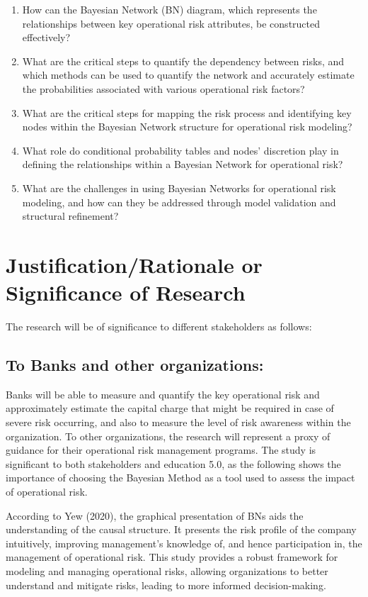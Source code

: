 \begin{enumerate}
    \item How can the Bayesian Network (BN) diagram, which represents the relationships between key operational risk attributes, be constructed effectively?
    \item What are the critical steps to quantify the dependency between risks, and which methods can be used to quantify the network and accurately estimate the probabilities associated with various operational risk factors?
    \item What are the critical steps for mapping the risk process and identifying key nodes within the Bayesian Network structure for operational risk modeling?
    \item What role do conditional probability tables and nodes' discretion play in defining the relationships within a Bayesian Network for operational risk?
    \item What are the challenges in using Bayesian Networks for operational risk modeling, and how can they be addressed through model validation and structural refinement?
\end{enumerate}

\section{Justification/Rationale or Significance of Research}
The research will be of significance to different stakeholders as follows: 

\subsection{To Banks and other organizations: }
Banks will be able to measure and quantify the key operational risk and approximately estimate the capital charge that might be required in case of severe risk occurring, and also to measure the level of risk awareness within the organization.  To other organizations, the research will represent a proxy of guidance for their operational risk management programs. The study is significant to both stakeholders and education 5.0, as the following shows the importance of choosing the Bayesian Method as a tool used to assess the impact of operational risk.

According to Yew (2020), the graphical presentation of BNs aids the understanding of the causal structure. It presents the risk profile of the company intuitively, improving management's knowledge of, and hence participation in, the management of operational risk.  This study provides a robust framework for modeling and managing operational risks, allowing organizations to better understand and mitigate risks, leading to more informed decision-making.

